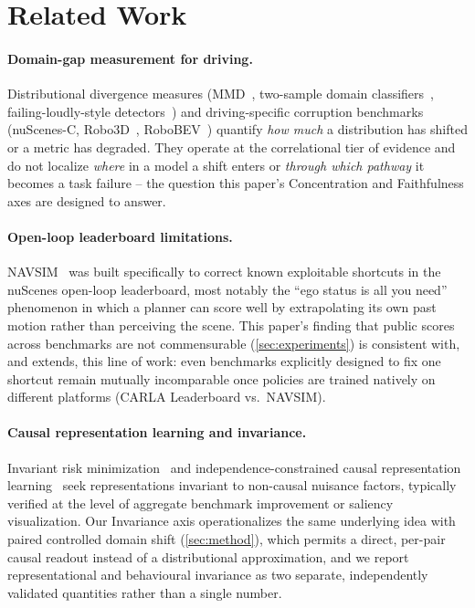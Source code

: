 \section{Related Work}
\label{sec:related}

\paragraph{Domain-gap measurement for driving.}
Distributional divergence measures (MMD~\cite{gretton2012mmd}, two-sample domain
classifiers~\cite{lopezpaz2017revisiting}, failing-loudly-style
detectors~\cite{rabanser2019failing}) and driving-specific corruption benchmarks
(nuScenes-C, Robo3D~\cite{kong2023robo3d}, RoboBEV~\cite{xie2023robobev}) quantify
\emph{how much} a distribution has shifted or a metric has degraded. They operate at the
correlational tier of evidence and do not localize \emph{where} in a model a shift
enters or \emph{through which pathway} it becomes a task failure -- the question this
paper's Concentration and Faithfulness axes are designed to answer.

\paragraph{Open-loop leaderboard limitations.}
NAVSIM~\cite{navsim2024} was built specifically to correct known exploitable shortcuts in
the nuScenes open-loop leaderboard, most notably the ``ego status is all you
need''\cite{egostatus2024} phenomenon in which a planner can score well by extrapolating
its own past motion rather than perceiving the scene. This paper's finding that public
scores across benchmarks are not commensurable (\cref{sec:experiments}) is consistent
with, and extends, this line of work: even benchmarks explicitly designed to fix one
shortcut remain mutually incomparable once policies are trained natively on different
platforms (CARLA Leaderboard vs.\ NAVSIM).

\paragraph{Causal representation learning and invariance.}
Invariant risk minimization~\cite{arjovsky2019irm} and independence-constrained causal
representation learning~\cite{icrl2025} seek representations invariant to
non-causal nuisance factors, typically verified at the level of aggregate benchmark
improvement or saliency visualization. Our Invariance axis operationalizes the same
underlying idea with paired controlled domain shift (\cref{sec:method}), which permits a
direct, per-pair causal readout instead of a distributional approximation, and we report
representational and behavioural invariance as two separate, independently validated
quantities rather than a single number.

